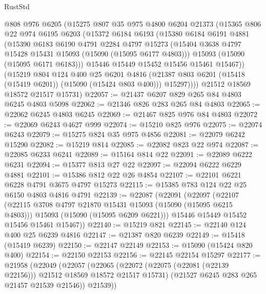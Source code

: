 \begin{lexlean}{RustStd}
\begin{coremodule}
        @808
        @976
        @6205
        (@15275
          @807
          @35
          @975
          @4800
          @6204
          @21373
          (@15365
            @806
            @22
            @974
            @6195
            @6203
            (@15372
              @6184
              @6193
              (@15380
                @6184
                @6191
                @4881
                (@15390
                  @6183
                  @6190
                  @4791
                  @2284
                  @4797
                  @15273
                  (@15404 @3638 @4797 @15428 @15431 @15093 (@15090 (@15095 @6177 @4803)))
                  @15093
                  (@15090 (@15095 @6171 @6183)))
                @15446
                @15449
                @15452
                @15456
                @15461
                @15467))
            (@15219
              @804
              @124
              @400
              @25
              @6201
              @4816
              (@21387 @803 @6201 (@15418 (@15419 @6201)) (@15090 (@15424 @803 @400)))
              @15297))))
      @21512
      @18569
      @18572
      @21517
      @15731)
@22057 := @21437 @6207 @829 @265 @84 @4803 @6245 @4803 @5098
@22062 := @21346 @826 @283 @265 @84 @4803
@22065 := @22062 @6245 @4803 @6245
@22069 := @21467 @825 @976 @84 @4803
@22072 := @22069 @6243 @4627 @999
@22074 := @15210 @825 @976
@22075 := @22074 @6243
@22079 := @15275 @824 @35 @975 @4856
@22081 := @22079 @6242 @15290
@22082 := @15219 @814
@22085 := @22082 @823 @22 @974
@22087 := @22085 @6233 @6241
@22089 := @15164 @814 @22
@22091 := @22089 @6222 @6231
@22094 := @15377 @813 @27 @22
@22097 := @22094 @6222 @6229 @4881
@22101 := @15386 @812 @22 @26 @4854
@22107 := @22101 @6221 @6228 @4791 @3675 @4797 @15273
@22115 := @15385 @783 @124 @22 @25 @6150 @4803 @4816 @4791
@22139 := @22087
    (@22091
      (@22097
        (@22107
          (@22115 @3708 @4797 @21870 @15431 @15093 (@15090 (@15095 @6215 @4803)))
          @15093
          (@15090 (@15095 @6209 @6221)))
        @15446
        @15449
        @15452
        @15456
        @15461
        @15467))
@22140 := @15219 @821
@22145 := @22140 @124 @400 @25 @6239 @4816
@22147 := @21387 @820 @6239
@22149 := @15418 (@15419 @6239)
@22150 := @22147 @22149
@22153 := @15090 (@15424 @820 @400)
@22154 := @22150 @22153
@22156 := @22145 @22154 @15297
@22177 := @21958
    (@22049
      (@22057
        (@22065
          (@22072 (@22075 (@22081 (@22139 @22156))) @21512 @18569 @18572 @21517 @15731)
          (@21527 @6245 @283 @265 @21457 @21539 @21546))
        @21539))

\end{coremodule}
\end{lexlean}
